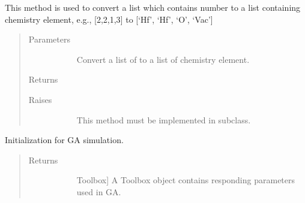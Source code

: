 \documentclass[letterpaper,10pt,english]{sphinxmanual}
\begin{document}
\begin{fulllineitems}
\begin{fulllineitems}
This method is used to convert a list which contains number
to a list containing chemistry element, e.g., {[}2,2,1,3{]} to
{[}‘Hf’, ‘Hf’, ‘O’, ‘Vac’{]}
\begin{quote}\begin{description}
\item[{Parameters}] \leavevmode\begin{description}
\item[{}] \leavevmode
Convert a list of  to a list of chemistry element.

\end{description}

\item[{Returns}] \leavevmode\begin{description}
\item[{}] \leavevmode
\end{description}

\item[{Raises}] \leavevmode\begin{description}
\item[{}] \leavevmode
This method must be implemented in subclass.

\end{description}

\end{description}\end{quote}

\end{fulllineitems}


\begin{fulllineitems}
\label{\detokenize{pygace:pygace.gace.AbstractApp.initial}}
Initialization for GA simulation.
\begin{quote}\begin{description}
\item[{Returns}] \leavevmode\begin{description}
\item[{}] \leavevmode{[}Toolbox{]}
A Toolbox object contains responding parameters used in GA.

\end{description}

\end{description}\end{quote}


\end{fulllineitems}
\end{fulllineitems}
\end{document}
